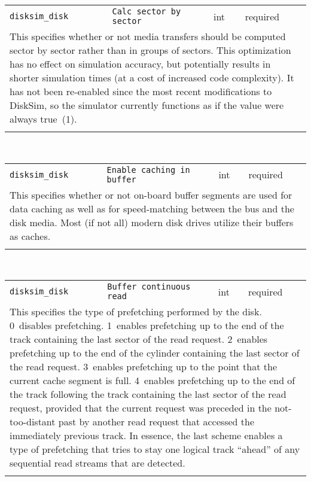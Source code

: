\noindent 
\begin{tabular}{|p{1.5in}|p{3.5in}|p{0.5in}|p{0.5in}|}
\cline{1-4}
\texttt{disksim\_disk} & \texttt{Calc sector by sector} & int & required \\ 
\cline{1-4}
\multicolumn{4}{|p{6in}|}{
This specifies whether or not media transfers should be computed sector by
sector rather than in groups of sectors. This optimization has no
effect on simulation accuracy, but potentially results in shorter
simulation times (at a cost of increased code complexity). It has not
been re-enabled since the most recent modifications to DiskSim, so the
simulator currently functions as if the value were always true~(1).
}\\ 
\cline{1-4}
\multicolumn{4}{p{5in}}{}\\
\end{tabular}\\ 
\noindent 
\begin{tabular}{|p{1.5in}|p{3.5in}|p{0.5in}|p{0.5in}|}
\cline{1-4}
\texttt{disksim\_disk} & \texttt{Enable caching in buffer} & int & required \\ 
\cline{1-4}
\multicolumn{4}{|p{6in}|}{
This specifies whether or not
on-board buffer segments are used for data caching as well as for
speed-matching between the bus and the disk media. Most (if not all) modern
disk drives utilize their buffers as caches.
}\\ 
\cline{1-4}
\multicolumn{4}{p{5in}}{}\\
\end{tabular}\\ 
\noindent 
\begin{tabular}{|p{1.5in}|p{3.5in}|p{0.5in}|p{0.5in}|}
\cline{1-4}
\texttt{disksim\_disk} & \texttt{Buffer continuous read} & int & required \\ 
\cline{1-4}
\multicolumn{4}{|p{6in}|}{
This specifies the type of prefetching performed by the disk. 0~disables
prefetching. 1~enables prefetching up to the end of the track
containing the last sector of the read request. 2~enables prefetching
up to the end of the cylinder containing the last sector of the read
request. 3~enables prefetching up to the point that the current cache
segment is full. 4~enables prefetching up to the end of the track
following the track containing the last sector of the read request,
provided that the current request was preceded in the not-too-distant
past by another read request that accessed the immediately previous
track. In essence, the last scheme enables a type of prefetching that
tries to stay one logical track ``ahead'' of any sequential read
streams that are detected.
}\\ 
\cline{1-4}
\multicolumn{4}{p{5in}}{}\\
\end{tabular}\\ 
